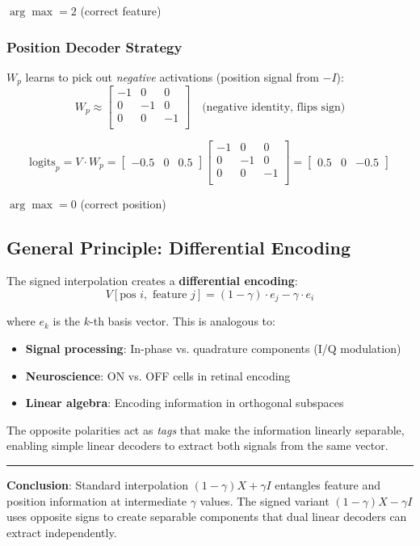 \documentclass[12pt]{article}
\begin{document}
$\arg\max = 2$ \checkmark \quad (correct feature)

\subsubsection*{Position Decoder Strategy}

$W_p$ learns to pick out \emph{negative} activations (position signal from $-I$):
\[
W_p \approx \begin{bmatrix}
-1 & 0 & 0 \\
0 & -1 & 0 \\
0 & 0 & -1 \\
\end{bmatrix}
\quad \text{(negative identity, flips sign)}
\]

\[
\text{logits}_p = V \cdot W_p = \begin{bmatrix} -0.5 & 0 & 0.5 \end{bmatrix}
\begin{bmatrix}
-1 & 0 & 0 \\
0 & -1 & 0 \\
0 & 0 & -1 \\
\end{bmatrix}
= \begin{bmatrix} \mathbf{0.5} & 0 & -0.5 \end{bmatrix}
\]

$\arg\max = 0$ \checkmark \quad (correct position)

\subsection*{General Principle: Differential Encoding}

The signed interpolation creates a \textbf{differential encoding}:
\[
V[\text{pos } i, \text{ feature } j] = (1-\gamma) \cdot e_j - \gamma \cdot e_i
\]

where $e_k$ is the $k$-th basis vector. This is analogous to:
\begin{itemize}
    \item \textbf{Signal processing}: In-phase vs. quadrature components (I/Q modulation)
    \item \textbf{Neuroscience}: ON vs. OFF cells in retinal encoding
    \item \textbf{Linear algebra}: Encoding information in orthogonal subspaces
\end{itemize}

The opposite polarities act as \emph{tags} that make the information linearly separable, enabling simple linear decoders to extract both signals from the same vector.

\vspace{1em}
\hrule
\vspace{1em}

\textbf{Conclusion}: Standard interpolation $(1-\gamma)X + \gamma I$ entangles feature and position information at intermediate $\gamma$ values. The signed variant $(1-\gamma)X - \gamma I$ uses opposite signs to create separable components that dual linear decoders can extract independently.
\end{document}
